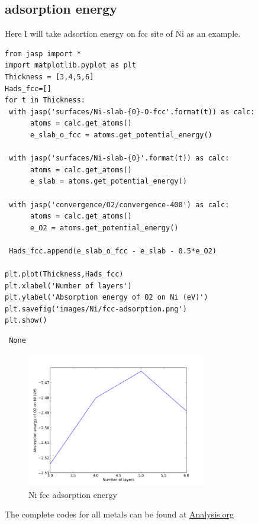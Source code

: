 \documentclass[11pt]{article}
\begin{document}
\subsection{adsorption energy}
\label{sec-3-5}

Here I will take adsortion energy on fcc site of Ni as an example.

\begin{verbatim}
from jasp import *
import matplotlib.pyplot as plt
Thickness = [3,4,5,6]
Hads_fcc=[]
for t in Thickness:
 with jasp('surfaces/Ni-slab-{0}-O-fcc'.format(t)) as calc:
      atoms = calc.get_atoms()
      e_slab_o_fcc = atoms.get_potential_energy()

 with jasp('surfaces/Ni-slab-{0}'.format(t)) as calc:
      atoms = calc.get_atoms()
      e_slab = atoms.get_potential_energy()

 with jasp('convergence/O2/convergence-400') as calc:
      atoms = calc.get_atoms()
      e_O2 = atoms.get_potential_energy()

 Hads_fcc.append(e_slab_o_fcc - e_slab - 0.5*e_O2)

plt.plot(Thickness,Hads_fcc)
plt.xlabel('Number of layers')
plt.ylabel('Absorption energy of O2 on Ni (eV)')
plt.savefig('images/Ni/fcc-adsorption.png')
plt.show()
\end{verbatim}

\begin{verbatim}
 None
\end{verbatim}
\begin{figure}[H]
\centering
\includegraphics[width=0.7\textwidth]{./images/Ni/fcc-adsorption.png}
\caption{Ni fcc adsorption energy}
\end{figure}

The complete codes for all metals can be found at \href{https://github.com/yichuns/FinalProject/blob/master/Analysis.org}{Analysis.org}
\end{document}
